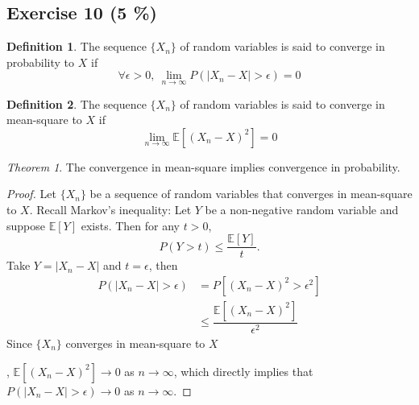 \documentclass[11pt]{article}
\theoremstyle{definition}
\newtheorem{definition}{Definition}[section]
\theoremstyle{remark}
\theoremstyle{remark}
\newtheorem{theorem}{Theorem}[section]
\newcommand{\E}[1]{\mathbb{E}\left[#1 \right]}
\begin{document}
\subsection*{Exercise 10 (5 \%)}
\begin{definition}
  The sequence $\{X_n\}$ of random variables is said to converge in
  probability to $X$ if
\[
\forall\epsilon>0, \ \lim_{n\rightarrow\infty}P\left(|X_n-X|>\epsilon\right)=0
\]
\end{definition}

\begin{definition}
  The sequence $\{X_n\}$ of random variables is said to converge in
  mean-square to $X$ if
\[
  \lim_{n\rightarrow\infty}\E{(X_n-X)^2}=0
\]
\end{definition}
\begin{theorem}
  The convergence in mean-square implies convergence in probability.
\end{theorem}

\begin{proof}
  Let $\{X_n\}$ be a sequence of random variables that converges in
  mean-square to $X$. Recall Markov's inequality: Let $Y$ be a
  non-negative random variable and suppose $\E{Y}$ exists. Then for
  any $t>0$,
\[
  P(Y>t) \leq \dfrac{\E{Y}}{t}.
\]
Take $Y=|X_n-X|$ and $t=\epsilon$, then
\[
\begin{split}
  P(|X_n-X|>\epsilon) &= P\left[(X_n-X)^2>\epsilon^2\right]\\
  & \leq \dfrac{\E{(X_n-X)^2}}{\epsilon^2}
\end{split}
\]
Since $\{X_n\}$ converges in mean-square to $X$

, $\E{(X_n-X)^2}\rightarrow0$ as $n\rightarrow\infty$, which directly
implies that $P(|X_n-X|>\epsilon)\rightarrow0$ as
$n\rightarrow\infty$.
\end{proof}
\end{document}
